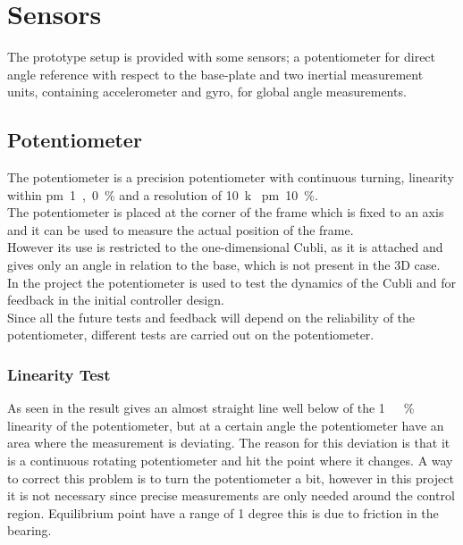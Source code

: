 \section{Sensors}
\label{sec:Sensors}
The prototype setup is provided with some sensors; a potentiometer for direct angle reference with respect to the base-plate and two inertial measurement units, containing accelerometer and gyro, for global angle measurements.

\subsection{Potentiometer}
The potentiometer is a precision potentiometer with continuous turning, linearity within \si{\pm1,0\%} and a resolution of \SI{10}{k\Omega} \si{\pm10\%}.\\
The potentiometer is placed at the corner of the frame which is fixed to an axis and it can be used to measure the actual position of the frame.\\
However its use is restricted to the one-dimensional Cubli, as it is attached and gives only an angle in relation to the base, which is not present in the 3D case.\\
In the project the potentiometer is used to test the dynamics of the Cubli and for feedback in the initial controller design.\\
Since all the future tests and feedback will depend on the reliability of the potentiometer, different tests are carried out on the potentiometer.
%
%
\subsubsection{Linearity Test}
As seen in  the result gives an almost straight line well below of the \si{1\ \%} linearity of the potentiometer, but at a certain angle the potentiometer have an area where the measurement is deviating. The reason for this deviation is that it is a continuous rotating potentiometer and hit the point where it changes. A way to correct this problem is to turn the potentiometer a bit, however in this project it is not necessary since precise measurements are only needed around the control region. 
Equilibrium point have a range of 1 degree this is due to friction in the bearing.
%
%
%
